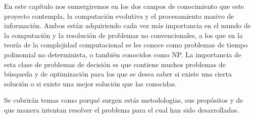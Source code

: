 En este cap\'itulo nos sumergiremos en los dos campos de conocimiento que este proyecto contempla, la computación evolutiva y el procesamiento masivo de información. Ambos están adquiriendo cada vez m\'as importancia en el mundo de la computación y la resolución de problemas no convencionales, a los que en la teoría de la complejidad computacional se les conoce como problemas de tiempo polinomial no determinista, o también conocidos como NP. La importancia de esta clase de problemas de decisión es que contiene muchos problemas de búsqueda y de optimización para los que se desea saber si existe una cierta solución o si existe una mejor solución que las conocidas.

Se cubrir\'an temas como porqu\'e surgen estás metodologías, sus propósitos y de que manera intentan resolver el problema para el cual han sido desarrolladas.